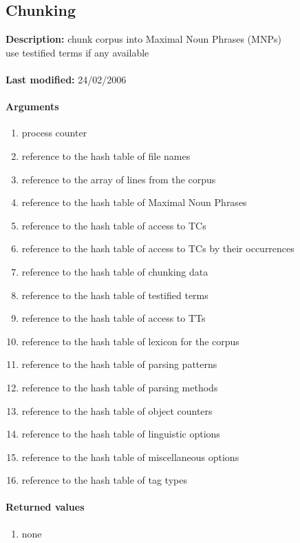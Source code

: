 \subsection{Chunking}
\textbf{Description:} chunk corpus into Maximal Noun Phrases (MNPs)\\
use testified terms if any available\\
\\\textbf{Last modified:} 24/02/2006

\paragraph{Arguments}
\begin{enumerate}
\item process counter
\item reference to the hash table of file names
\item reference to the array of lines from the corpus
\item reference to the hash table of Maximal Noun Phrases
\item reference to the hash table of access to TCs
\item reference to the hash table of access to TCs by their occurrences
\item reference to the hash table of chunking data
\item reference to the hash table of testified terms
\item reference to the hash table of access to TTs
\item reference to the hash table of lexicon for the corpus
\item reference to the hash table of parsing patterns
\item reference to the hash table of parsing methods
\item reference to the hash table of object counters
\item reference to the hash table of linguistic options
\item reference to the hash table of miscellaneous options
\item reference to the hash table of tag types
\end{enumerate}

\paragraph{Returned values}
\begin{enumerate}
\item none
\end{enumerate}

